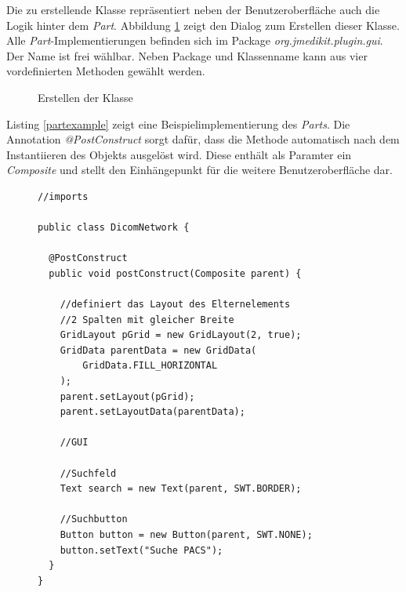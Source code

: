 Die zu erstellende Klasse repräsentiert neben der Benutzeroberfläche auch die Logik hinter dem \textit{Part}. Abbildung \ref{partclass} zeigt den Dialog zum Erstellen dieser Klasse. Alle \textit{Part}-Implementierungen befinden sich im Package \textit{org.jmedikit.plugin.gui}. Der Name ist frei wählbar. Neben Package und Klassenname kann aus vier vordefinierten Methoden gewählt werden.

\begin{figure}[H]
  \vspace{0.5cm}
  \centering
   \caption{Erstellen der Klasse}
  \label{partclass}
  \vspace{0.5cm}
\end{figure}

Listing \ref{partexample} zeigt eine Beispielimplementierung des \textit{Parts}. Die Annotation \textit{@PostConstruct} sorgt dafür, dass die Methode automatisch nach dem Instantiieren des Objekts ausgelöst wird. Diese enthält als Paramter ein \textit{Composite} und stellt den Einhängepunkt für die weitere Benutzeroberfläche dar.

\begin{figure}[htbp]
\begin{lstlisting}[frame=leftline]
//imports

public class DicomNetwork {

  @PostConstruct
  public void postConstruct(Composite parent) {
	
    //definiert das Layout des Elternelements
    //2 Spalten mit gleicher Breite
    GridLayout pGrid = new GridLayout(2, true);
    GridData parentData = new GridData(
        GridData.FILL_HORIZONTAL
    );
    parent.setLayout(pGrid);
    parent.setLayoutData(parentData);

    //GUI

    //Suchfeld
    Text search = new Text(parent, SWT.BORDER);
    
    //Suchbutton
    Button button = new Button(parent, SWT.NONE);
    button.setText("Suche PACS");	
  }	
}
\end{lstlisting}
\end{figure}

